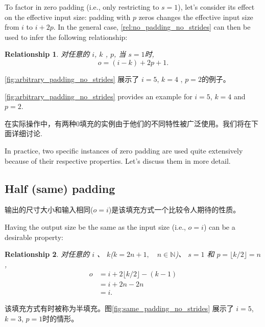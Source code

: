 \documentclass[notitlepage]{report}
\newtheorem{relationship}{Relationship}
\begin{document}
To factor in zero padding (i.e., only restricting to $s = 1$), let's consider
its effect on the effective input size: padding with $p$ zeros changes the
effective input size from $i$ to $i + 2p$. In the general case,
\autoref{rel:no_padding_no_strides} can then be used to infer the following
relationship:

\begin{relationship}\label{rel:arbitrary_padding_no_strides}
对任意的 $i$, $k$ , $p$, 当 $s = 1$时,
\begin{equation*}
    o = (i - k) + 2p + 1.
\end{equation*}
\end{relationship}

\noindent \autoref{fig:arbitrary_padding_no_strides} 展示了 $i
= 5$, $k = 4$ , $p = 2$的例子。

\noindent \autoref{fig:arbitrary_padding_no_strides} provides an example for $i
= 5$, $k = 4$ and $p = 2$.

在实际操作中，有两种0填充的实例由于他们的不同特性被广泛使用。我们将在下面详细讨论.

In practice, two specific instances of zero padding are used quite extensively
because of their respective properties. Let's discuss them in more detail.

\subsection{Half (same) padding}

输出的尺寸大小和输入相同($o = i$)是该填充方式一个比较令人期待的性质。

Having the output size be the same as the input size (i.e., $o = i$) can be a
desirable property:

\begin{relationship}\label{rel:same_padding_no_strides}
对任意的 $i$ 、 $k$($k = 2n + 1, \quad n \in \mathbb{N}$)、 $s = 1$ 和
$p = \lfloor k / 2 \rfloor = n$,
\begin{equation*}
\begin{split}
    o &= i + 2 \lfloor k / 2 \rfloor - (k - 1) \\
      &= i + 2n - 2n \\
      &= i.
\end{split}
\end{equation*}
\end{relationship}


\noindent 该填充方式有时被称为半填充。图\autoref{fig:same_padding_no_strides} 展示了
$i = 5$, $k = 3$, $p = 1$时的情形。
\end{document}
